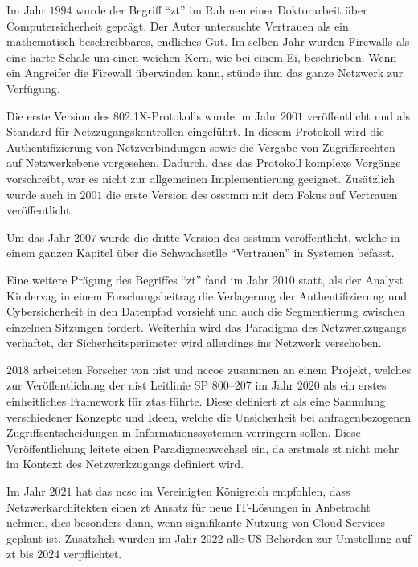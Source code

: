 Im Jahr $1994$ wurde der Begriff \enquote{\ac{zt}} im Rahmen einer Doktorarbeit über Computersicherheit geprägt.
Der Autor untersuchte Vertrauen als ein mathematisch beschreibbares, endliches Gut.\autocite[\vglf][]{marsh-1994}
Im selben Jahr wurden Firewalls als eine harte Schale um einen weichen Kern, wie bei einem Ei, beschrieben.
Wenn ein Angreifer die Firewall überwinden kann, stünde ihm das ganze Netzwerk zur Verfügung. \autocite[\vglf][]{world-1994}

Die erste Version des 802.1X-Protokolls\autocite[\vglf][]{IEEE-2001} wurde im Jahr $2001$ veröffentlicht und als Standard für Netzzugangskontrollen eingeführt.
In diesem Protokoll wird die Authentifizierung von Netzverbindungen sowie die Vergabe von Zugriffsrechten auf Netzwerkebene vorgesehen.
Dadurch, dass das Protokoll komplexe Vorgänge vorschreibt, war es nicht zur allgemeinen Implementierung geeignet.\autocite[\vglf][]{zscaler-2022b}
Zusätzlich wurde auch in $2001$ die erste Version des \ac{osstmm} mit dem Fokus auf Vertrauen veröffentlicht.\autocite[\vglf][]{osstmm-2001}

Um das Jahr $2007$ wurde die dritte Version des \ac{osstmm} veröffentlicht, welche in einem ganzen Kapitel über die Schwachsetlle \enquote{Vertrauen} in Systemen befasst.\autocite[\vglf][]{osstmm-2010}

Eine weitere Prägung des Begriffes \enquote{\ac{zt}} fand im Jahr $2010$ statt, als der Analyst Kindervag in einem Forschungsbeitrag die Verlagerung der Authentifizierung und Cybersicherheit in den Datenpfad vorsieht und auch die Segmentierung zwischen einzelnen Sitzungen fordert.
Weiterhin wird das Paradigma des Netzwerkzugangs verhaftet, der Sicherheitsperimeter wird allerdings ins Netzwerk verschoben.\autocites[\vglf][]{zscaler-2022b}[\vglf][]{kindervag-2010}

$2018$ arbeiteten Forscher von \ac{nist} und \ac{nccoe} zusammen an einem Projekt, welches zur Veröffentlichung der \ac{nist} Leitlinie SP 800--207\autocite{NIST:800207} im Jahr $2020$ als ein erstes einheitliches Framework für \acp{zta} führte.
Diese definiert \ac{zt} als eine Sammlung verschiedener Konzepte und Ideen, welche die Unsicherheit bei anfragenbezogenen Zugriffsentscheidungen in Informationssystemen verringern sollen.
Diese Veröffentlichung leitete einen Paradigmenwechsel ein, da erstmals \ac{zt} nicht mehr im Kontext des Netzwerkzugangs definiert wird.\autocite[\vglf][]{zscaler-2022b}

Im Jahr $2021$ hat das \ac{ncsc} im Vereinigten Königreich empfohlen, dass Netzwerkarchitekten einen \ac{zt} Ansatz für neue IT-Lösungen in Anbetracht nehmen, dies besonders dann, wenn signifikante Nutzung von Cloud-Services geplant ist.\autocite{ncsc-2021}
Zusätzlich wurden im Jahr $2022$ alle US-Behörden zur Umstellung auf \ac{zt} bis $2024$ verpflichtet.\autocite[\vglf][]{zscaler-2022b}


